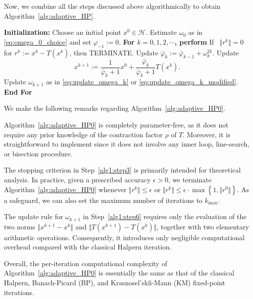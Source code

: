 \documentclass{article}
\theoremstyle{plain}
\theoremstyle{definition}
\newcommand{\set}[1]{\left\{#1\right\}}
\newcommand{\norms}[1]{\Vert#1\Vert}
\newcommand{\0}{\boldsymbol{0}}
\begin{document}
Now, we combine all the steps discussed above algorithmically to obtain Algorithm~\ref{alg:adaptive_HP}.

\begin{algorithm}[!htbp]
\caption{(Parameter-Free Halpern Fixed-Point Algorithm)}\label{alg:adaptive_HP0}
\begin{algorithmic}[1]
\State\textbf{Initialization:} Choose an initial point $x^0\in\mathcal H$.
Estimate $\omega_0$ as in \eqref{eq:omega_0_choice} and set $\varphi_{-1} := 0$.
\State \textbf{For $k = 0, 1, 2, \cdots$, perform}
\State\hspace{3ex}\label{alg1:step3}If ~$\norms{r^k} = 0$ for $r^k := x^k - T(x^k)$,  then TERMINATE.
\State\hspace{3ex}Update $\bar{\varphi}_{k} := \bar{\varphi}_{k-1} + \omega_k^{2k}$.
\State\hspace{3ex}\label{alg1:step5}Update
\begin{equation*}
x^{k+1} :=  \frac{1}{ \bar{\varphi}_k + 1} x^0 + \frac{ \bar{\varphi}_k}{\bar{\varphi}_k + 1}T(x^k).
\end{equation*}
\State\hspace{3ex}\label{alg1:step6}Update $\omega_{k+1}$ as in \eqref{eq:update_omega_k} or \eqref{eq:update_omega_k_modified}.
\State\textbf{End For}
\end{algorithmic}
\end{algorithm}

\noindent
We make the following remarks regarding Algorithm~\ref{alg:adaptive_HP0}.
\begin{compactitem}
\item Algorithm~\ref{alg:adaptive_HP0} is completely parameter-free, as it does not require any prior knowledge of the contraction factor $\rho$ of $T$. 
Moreover, it is straightforward to implement since it does not involve any inner loop, line-search, or bisection procedure.

\item The stopping criterion in Step~\ref{alg1:step3} is primarily intended for theoretical analysis. 
In practice, given a prescribed accuracy $\epsilon > 0$, we terminate Algorithm~\ref{alg:adaptive_HP0} whenever $\norms{r^k} \leq \epsilon$ or $\norms{r^k} \leq \epsilon\cdot\max\set{1, \norms{r^0}}$.
As a safeguard, we can also set the maximum number of iterations to $k_{\max}$.

\item The update rule for $\omega_{k+1}$ in Step~\ref{alg1:step6} requires only the evaluation of the two norms $\norms{x^{k+1} - x^k}$ and $\norms{T(x^{k+1}) - T(x^k)}$, together with two elementary arithmetic operations. 
Consequently, it introduces only negligible computational overhead compared with the classical Halpern iteration.
\end{compactitem}
Overall, the per-iteration computational complexity of Algorithm~\ref{alg:adaptive_HP0} is essentially the same as that of the classical Halpern, Banach-Picard (BP), and Krasnosel'ski\v{\i}-Mann (KM) fixed-point iterations.
\end{document}
